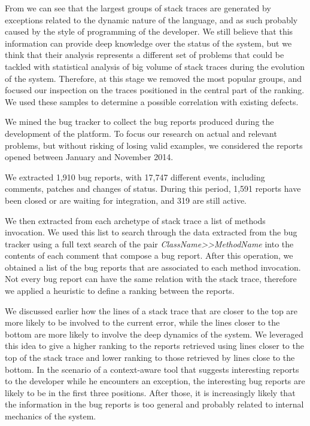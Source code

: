 From  we can see that the largest groups of stack traces are generated by exceptions related to the dynamic nature of the language, and as such probably caused by the style of programming of the developer.
We still believe that this information can provide deep knowledge over the status of the system, but we think that their analysis represents a different set of problems that could be tackled with statistical analysis of big volume of stack traces during the evolution of the system.
Therefore, at this stage we removed the most popular groups, and focused our inspection on the traces positioned in the central part of the ranking.
We used these samples to determine a possible correlation with existing defects.

We mined the \pha bug tracker to collect the bug reports produced during the development of the platform.
To focus our research on actual and relevant problems, but without risking of losing valid examples, we considered the reports opened between January and November 2014.

We extracted 1,910 bug reports, with 17,747 different events, including comments, patches and changes of status.
During this period, 1,591 reports have been closed or are waiting for integration, and 319 are still active.

We then extracted from each archetype of stack trace a list of methods invocation.
We used this list to search through the data extracted from the bug tracker using a full text search of the pair \emph{ClassName{>}{>}MethodName} into the contents of each comment that compose a bug report.
After this operation, we obtained a list of the bug reports that are associated to each method invocation.
Not every bug report can have the same relation with the stack trace, therefore we applied a heuristic to define a ranking between the reports.

We discussed earlier how the lines of a stack trace that are closer to the top are more likely to be involved to the current error, while the lines closer to the bottom are more likely to involve the deep dynamics of the system.
We leveraged this idea to give a higher ranking to the reports retrieved using lines closer to the top of the stack trace and lower ranking to those retrieved by lines close to the bottom.
In the scenario of a context-aware tool that suggests interesting reports to the developer while he encounters an exception, the interesting bug reports are likely to be in the first three positions.
After those, it is increasingly likely that the information in the bug reports is too general and probably related to internal mechanics of the system.



